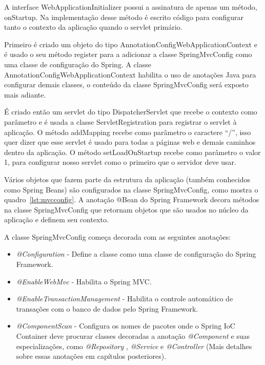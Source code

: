 \documentclass[a4paper,12pt]{article}
\newcommand{\annotation}[1] {
	\textit{#1}
}
\newcommand{\javacode}[3] {
	
	\FloatBarrier
}
\begin{document}
A interface WebApplicationInitializer possui a assinatura de apenas um método, onStartup. Na implementação desse método é escrito código para configurar tanto o contexto da aplicação quando o servlet primário.

Primeiro é criado um objeto do tipo AnnotationConfigWebApplicationContext e é usado o seu método register para a adicionar a classe SpringMvcConfig como uma classe de configuração do Spring. A classe AnnotationConfigWebApplicationContext habilita o uso de anotações Java para configurar demais classes, o conteúdo da classe SpringMvcConfig será exposto mais adiante.

É criado então um servlet do tipo DispatcherServlet que recebe o contexto como parâmetro e  é usada a classe ServletRegistration para registrar o servlet à aplicação. O método addMapping recebe como parâmetro o caractere “/”, isso quer dizer que esse servlet é usado para todas a páginas web e demais caminhos dentro da aplicação. O método setLoadOnStartup recebe como parâmetro o valor 1, para configurar nosso servlet como o primeiro que o servidor deve usar.

\javacode{code/AppInitializer.txt}{Classe AppInitializer}{lst:4}

Vários objetos que fazem parte da estrutura da aplicação (também conhecidos como Spring Beans) são configurados na classe SpringMvcConfig, como mostra o quadro~\ref{lst:mvcconfig}. A anotação @Bean do Spring Framework decora métodos na classe SpringMvcConfig que retornam objetos que são usados no núcleo da aplicação e definem seu contexto.

A classe SpringMvcConfig começa decorada com as seguintes anotações:

\begin{itemize}
  \item \annotation{@Configuration} - Define a classe como uma classe de configuração do Spring Framework.
  \item \annotation{@EnableWebMvc} - Habilita o Spring MVC.
  \item \annotation{@EnableTransactionManagement} - Habilita o controle automático de transações com o banco de dados pelo Spring Framework.
  \item \annotation{@ComponentScan} - Configura os nomes de pacotes onde o Spring IoC Container deve procurar classes decoradas a anotação \annotation{@Component} e suas especializações, como \annotation{@Repository}, \annotation{@Service} e \annotation{@Controller} (Mais detalhes sobre essas anotações em capítulos posteriores).  
\end{itemize}
\end{document}
